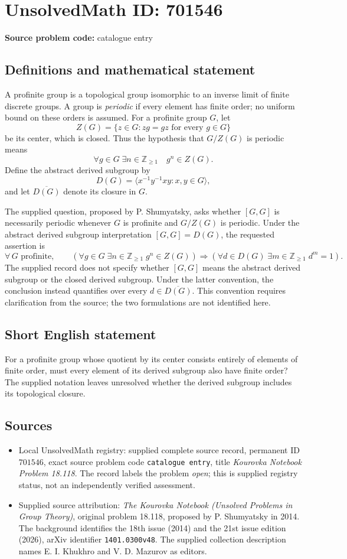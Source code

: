\documentclass[11pt]{article}
\newcommand{\Z}{\mathbb{Z}}
\begin{document}
\section*{UnsolvedMath ID: 701546}
\textbf{Source problem code:} catalogue entry
\subsection{Definitions and mathematical statement}
A profinite group is a topological group isomorphic to an inverse limit of finite discrete groups. A group is \emph{periodic} if every element has finite order; no uniform bound on these orders is assumed. For a profinite group \(G\), let
\[
Z(G)=\{z\in G:zg=gz\text{ for every }g\in G\}
\]
be its center, which is closed. Thus the hypothesis that \(G/Z(G)\) is periodic means
\[
\forall g\in G\;\exists n\in\Z_{\geq 1}\quad g^n\in Z(G).
\]
Define the abstract derived subgroup by
\[
D(G)=\langle x^{-1}y^{-1}xy:x,y\in G\rangle,
\]
and let \(\overline{D(G)}\) denote its closure in \(G\).

The supplied question, proposed by P. Shumyatsky, asks whether \([G,G]\) is necessarily periodic whenever \(G\) is profinite and \(G/Z(G)\) is periodic. Under the abstract derived subgroup interpretation \([G,G]=D(G)\), the requested assertion is
\[
\forall\,G\text{ profinite},\qquad
\left(\forall g\in G\;\exists n\in\Z_{\geq1}\;g^n\in Z(G)\right)
\Longrightarrow
\left(\forall d\in D(G)\;\exists m\in\Z_{\geq1}\;d^m=1\right).
\]
The supplied record does not specify whether \([G,G]\) means the abstract derived subgroup or the closed derived subgroup. Under the latter convention, the conclusion instead quantifies over every \(d\in\overline{D(G)}\). This convention requires clarification from the source; the two formulations are not identified here.
\subsection{Short English statement}
For a profinite group whose quotient by its center consists entirely of elements of finite order, must every element of its derived subgroup also have finite order? The supplied notation leaves unresolved whether the derived subgroup includes its topological closure.
\subsection{Sources}
\begin{itemize}
\item Local UnsolvedMath registry: supplied complete source record, permanent ID \(701546\), exact source problem code \texttt{catalogue entry}, title \emph{Kourovka Notebook Problem 18.118}. The record labels the problem \emph{open}; this is supplied registry status, not an independently verified assessment.
\item Supplied source attribution: \emph{The Kourovka Notebook (Unsolved Problems in Group Theory)}, original problem 18.118, proposed by P. Shumyatsky in 2014. The background identifies the 18th issue (2014) and the 21st issue edition (2026), arXiv identifier \texttt{1401.0300v48}. The supplied collection description names E. I. Khukhro and V. D. Mazurov as editors.
\end{itemize}
\end{document}
